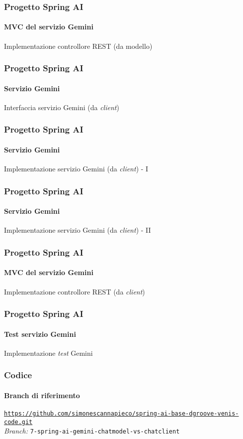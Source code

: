 %
\begin{frame}[t,fragile] \frametitle{Progetto Spring AI}
    \framesubtitle{MVC del servizio Gemini}
    	\vspace*{-.7cm}
        \begin{block}{Implementazione controllore REST (da modello)}
			{\tiny}
    	\end{block}
\end{frame}
%
\begin{frame}[t,fragile] \frametitle{Progetto Spring AI}
    \framesubtitle{Servizio Gemini}
        \begin{block}{Interfaccia servizio Gemini (da \textit{client})}
{\tiny}
    \end{block}
\end{frame}
%
\begin{frame}[t,fragile] \frametitle{Progetto Spring AI}
    \framesubtitle{Servizio Gemini}
		\vspace*{-.7cm}
        \begin{block}{Implementazione servizio Gemini (da \textit{client}) - I}
{\tiny}
    \end{block}
\end{frame}
%
\begin{frame}[t,fragile] \frametitle{Progetto Spring AI}
    \framesubtitle{Servizio Gemini}
        \begin{block}{Implementazione servizio Gemini (da \textit{client}) - II}
{\tiny}
    \end{block}
\end{frame}
%
\begin{frame}[t,fragile] \frametitle{Progetto Spring AI}
    \framesubtitle{MVC del servizio Gemini}
    	\vspace*{-.7cm}
        \begin{block}{Implementazione controllore REST (da \textit{client})}
			{\tiny}
    	\end{block}
\end{frame}
%
\begin{frame}[t,fragile] \frametitle{Progetto Spring AI}
    \framesubtitle{Test servizio Gemini}
        \begin{block}{Implementazione \textit{test} Gemini}
{\tiny}
    \end{block}
\end{frame}
%
\begin{frame}[fragile] \frametitle{Codice}
    \framesubtitle{Branch di riferimento}
	\begin{center}
		{\scriptsize \href{https://github.com/simonescannapieco/spring-ai-base-dgroove-venis-code.git}{\texttt{https://github.com/simonescannapieco/spring-ai-base-dgroove-venis-code.git}}}\\
		\textit{Branch:} \alert{\texttt{7-spring-ai-gemini-chatmodel-vs-chatclient}}
	\end{center}
\end{frame}